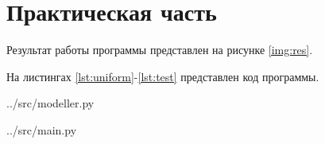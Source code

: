 \chapter{Практическая часть}

Результат работы программы представлен на рисунке \ref{img:res}. 


На листингах \ref{lst:uniform}-\ref{lst:test} представлен код программы.

\begin{lstinputlisting}[label=lst:uniform,caption=Моделирование работы информационного центра, language=python]{../src/modeller.py}
\end{lstinputlisting}

\begin{lstinputlisting}[label=lst:test,caption=Моделирование работы информационного центра, language=python]{../src/main.py}
\end{lstinputlisting}

